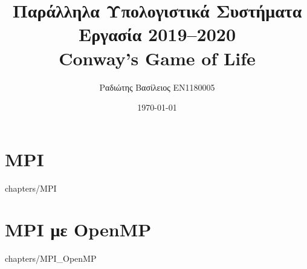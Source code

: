 \documentclass[a4paper,twoside,12pt]{report}
\title {Παράλληλα Υπολογιστικά Συστήματα\\Εργασία 2019--2020\\Conway’s Game of Life}
\author {Ραδιώτης Βασίλειος EN1180005}
\date {\today}
\begin{document}
\maketitle

\tableofcontents{}

\chapter {MPI}
     {chapters/MPI}

\chapter {MPI με OpenMP}
     {chapters/MPI_OpenMP}
\end{document}
